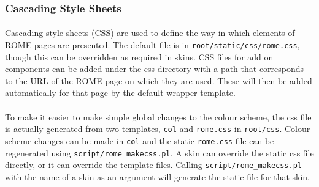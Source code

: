 \subsubsection{Cascading Style Sheets}
\label{sec:view_css}

\paragraph{}
Cascading style sheets (CSS) are used to define the way in which elements of ROME pages are presented. The default file is in \texttt{root/static/css/rome.css}, though this can be overridden as required in skins. CSS files for add on components can be added under the css directory with a path that corresponds to the URL of the ROME page on which they are used. These will then be added automatically for that page by the default wrapper template.

\paragraph{}
To make it easier to make simple global changes to the colour scheme, the css file is actually generated from two templates, \texttt{col} and \texttt{rome.css} in \texttt{root/css}. Colour scheme changes can be made in \texttt{col} and the static \texttt{rome.css} file can be regenerated using \texttt{script/rome\_makecss.pl}. A skin can override the static css file directly, or it can override the template files. Calling \texttt{script/rome\_makecss.pl} with the name of a skin as an argument will generate the static file for that skin.